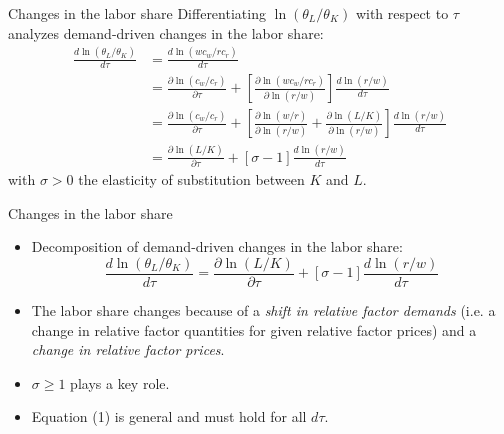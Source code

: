 \documentclass[notes=show]{beamer}
\begin{document}
\begin{frame}{Changes in the labor share}
Differentiating $ \ln(\theta_{L} / \theta_{K}) $ with respect to $\tau$ analyzes demand-driven changes in the labor share:
\begin{align*}
    \frac{d \ln(\theta_{L} / \theta_{K})}{d \tau} & = \frac{d \ln(wc_{w} / rc_{r})}{d \tau} \nonumber \\
    & = \frac{\partial \ln(c_{w} / c_{r})}{\partial \tau} + \left[ \frac{\partial \ln(wc_{w} / rc_{r})}{\partial \ln(r / w )} \right] \frac{d \ln(r / w)}{d \tau} \nonumber \\
     & = \frac{\partial \ln(c_{w} / c_{r})}{\partial \tau} + \left[ \frac{\partial \ln(w / r)}{\partial \ln(r / w ) } + \frac{\partial \ln(L / K)}{\partial \ln(r / w ) } \right] \frac{d \ln(r / w)}{d \tau} \nonumber \\
    & = \frac{\partial \ln(L / K) }{\partial \tau} + [ \sigma - 1 ] \frac{d \ln(r / w) }{d \tau} \tag{1}
\end{align*}
with $\sigma > 0 $ the elasticity of substitution between $K$ and $L$.
\end{frame}

\begin{frame}{Changes in the labor share}
\begin{itemize}
\item Decomposition of demand-driven changes in the labor share:
\begin{equation*}
    \frac{d \ln(\theta_{L} / \theta_{K})}{d \tau} = \frac{\partial \ln(L / K) }{\partial \tau} + [ \sigma - 1 ] \frac{d \ln(r / w) }{d \tau} \tag{1}
\end{equation*}
\item The labor share changes because of a \textit{shift in relative factor demands} (i.e. a change in relative factor quantities for given relative factor prices) and a \textit{change in relative factor prices}. \medskip
\item $ \sigma  \geq 1$ plays a key role. \medskip
\item Equation (1) is general and must hold for all $ d \tau $.
\end{itemize}
\end{frame}
\end{document}
